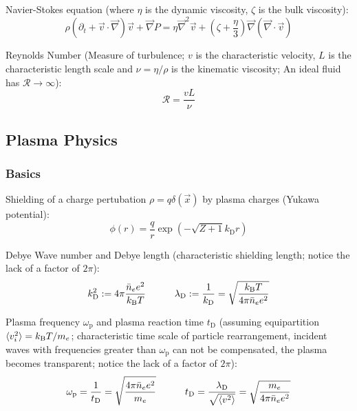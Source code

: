 			\noindent
			Navier-Stokes equation (where $\eta$ is the dynamic viscosity, $\zeta$ is the bulk viscosity):
			\begin{equation}
				\rho\left(\partial_{t}+\vec{v}\cdot\vec{\nabla}\right)\vec{v}+\vec{\nabla}P=\eta\vec{\nabla}^{2}\vec{v}+\left(\zeta+\frac{\eta}{3}\right)\vec{\nabla}\left(\vec{\nabla}\cdot\vec{v}\right)
			\end{equation}

			\noindent
			Reynolds Number (Measure of turbulence; $v$ is the characteristic velocity, $L$ is the characteristic length scale and $\nu = \eta / \rho$ is the kinematic viscosity; An ideal fluid has $\mathcal{R} \to \infty$):
			\begin{equation}
				\mathcal{R} = \frac{v L}{\nu}
			\end{equation}

	\subsection{Plasma Physics}
		\subsubsection{Basics}
			Shielding of a charge pertubation $\rho=q\delta(\vec{x})$ by plasma charges (Yukawa potential):
			\begin{equation}
				\phi(r) = \frac{q}{r} \exp(-\sqrt{Z+1}k_\text{D} r)
			\end{equation}

			\noindent
			Debye Wave number and Debye length (characteristic shielding length; notice the lack of a factor of $2\pi$):
			\begin{equation}
				k_\text{D}^2 := 4\pi \frac{\bar{n}_e e^2}{k_{\text{B}} T} \hspace{30pt}
				\lambda_\text{D} := \frac{1}{k_\text{D}} = \sqrt{\frac{k_{\text{B}} T}{4\pi \bar{n}_e e^2}}
			\end{equation}

			\noindent
			Plasma frequency $\omega_\text{p}$ and plasma reaction time $t_\text{D}$ (assuming equipartition $\langle v_i^2 \rangle = k_{\text{B}} T / m_e$; characteristic time scale of particle rearrangement, incident waves with frequencies greater than $\omega_\text{p}$ can not be compensated, the plasma becomes transparent; notice the lack of a factor of $2\pi$):
			\begin{equation}
				\omega_\text{p} = \frac{1}{t_\text{D}} = \sqrt{\frac{4\pi\bar{n}_e e^2}{m_e}} \hspace{30pt}
				t_\text{D} = \frac{\lambda_\text{D}}{\sqrt{\langle v^2 \rangle}} = \sqrt{\frac{m_e}{4\pi \bar{n}_e e^2}}
			\end{equation}


